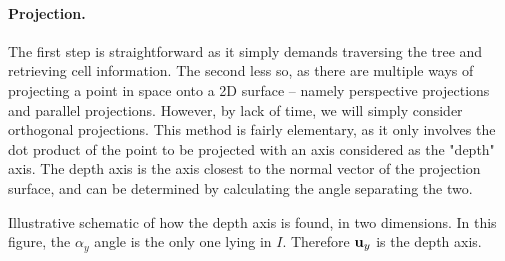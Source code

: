 \documentclass[
	a4paper,
	12pt,
	raggedright,
	twoside
]{tufte-style-article}
\theoremstyle{definition}
\theoremstyle{remark}
\begin{document}
\paragraph{Projection.} The first step is straightforward as it simply demands traversing the tree and retrieving cell information. The second less so, as there are multiple ways of projecting a point in space onto a 2D surface -- namely perspective projections and parallel projections. However, by lack of time, we will simply consider orthogonal projections. This method is fairly elementary, as it only involves the dot product of the point to be projected with an axis considered as the "depth" axis. The depth axis is the axis closest to the normal vector of the projection surface, and can be determined by calculating the angle separating the two.

\begin{marginfigure}
    \centering
    
    \caption{Illustrative schematic of how the depth axis is found, in two dimensions. In this figure, the $\alpha_y$ angle is the only one lying in $I$. Therefore $\vb{u}_y$ is the depth axis. \label{fig:depth_axis}}
\end{marginfigure}
\end{document}
